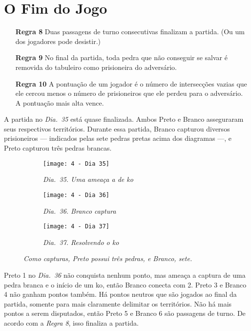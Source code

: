 \chapter{O Fim do Jogo}

\begin{itemize}
    \item[\textbf{Regra 8}] Duas passagens de turno consecutivas finalizam a partida. (Ou um dos jogadores pode desistir.)
    \item[\textbf{Regra 9}] No final da partida, toda pedra que não conseguir se salvar é removida do tabuleiro como prisioneira do adversário.
    \item[\textbf{Regra 10}] A pontuação de um jogador é o número de intersecções vazias que ele cercou menos o número de prisioneiros que ele perdeu para o adversário. A pontuação mais alta vence.
\end{itemize}

A partida no \emph{Dia.\@~35} está quase finalizada. Ambos Preto e Branco asseguraram seus respectivos territórios. Durante essa partida, Branco capturou diversos prisioneiros --- indicados pelas sete pedras pretas acima dos diagramas ---, e Preto capturou três pedras brancas.

\begin{figure}[h!]
    \centering
    \begin{subfigure}[t]{.3\textwidth}
        \centering
        \texttt{[image: 4 - Dia 35]}
        \caption*{\emph{Dia.\@~35. Uma ameaça a de ko}}
    \end{subfigure}
    \hfill
    \begin{subfigure}[t]{.3\textwidth}
        \centering
        \texttt{[image: 4 - Dia 36]}
        \caption*{\emph{Dia.\@~36. Branco captura}}
    \end{subfigure}
    \hfill
    \begin{subfigure}[t]{.3\textwidth}
        \centering
        \texttt{[image: 4 - Dia 37]}
        \caption*{\emph{Dia.\@~37. Resolvendo o ko}}
    \end{subfigure}
    \caption*{\emph{Como capturas, Preto possui três pedras, e Branco, sete.}}
\end{figure}
 
Preto 1 no \emph{Dia.\@~36} não conquista nenhum ponto, mas ameaça a captura de uma pedra branca e o início de um ko, então Branco conecta com 2. Preto 3 e Branco 4 não ganham pontos também. Há pontos neutros que são jogados ao final da partida, somente para mais claramente delimitar os territórios. Não há mais pontos a serem disputados, então Preto 5 e Branco 6 são passagens de turno. De acordo com a \emph{Regra 8}, isso finaliza a partida.

